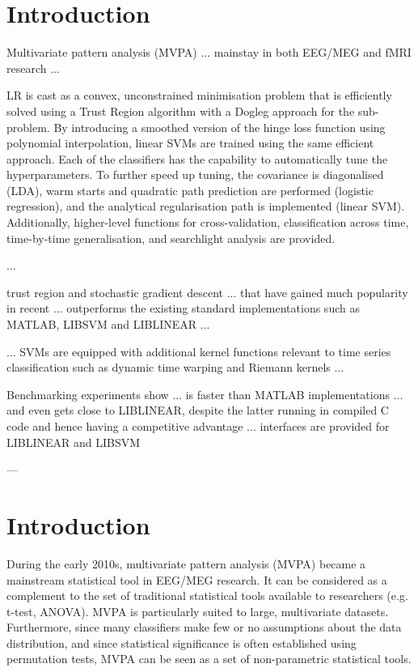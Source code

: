 \documentclass[utf8]{frontiersSCNS} %
\begin{document}
\section{Introduction}

Multivariate pattern analysis (MVPA) ... mainstay in both EEG/MEG and fMRI research ...


LR is cast as a convex, unconstrained minimisation problem that is efficiently solved using a Trust Region algorithm with a Dogleg approach for the sub-problem. By introducing a smoothed version of the hinge loss function using polynomial interpolation, linear SVMs are trained using the same efficient approach. Each of the classifiers has the capability to automatically tune the hyperparameters. To further speed up tuning, the covariance is diagonalised (LDA), warm starts and quadratic path prediction are performed (logistic regression), and the analytical regularisation path is implemented (linear SVM). Additionally, higher-level functions for cross-validation, classification across time, time-by-time generalisation, and searchlight analysis are provided.

...

trust region and stochastic gradient descent ... that have gained much popularity in recent ...
outperforms the existing standard implementations such as MATLAB, LIBSVM and LIBLINEAR ...

...
SVMs are equipped with additional kernel functions relevant to time series classification such as dynamic time warping and Riemann kernels ...


Benchmarking experiments show ... is faster than MATLAB implementations ... and even gets close to LIBLINEAR, despite the latter running in compiled C code and hence having a competitive advantage ...
interfaces are provided for LIBLINEAR and LIBSVM

---

\section{Introduction}

During the early 2010s, multivariate pattern analysis (MVPA) became a mainstream statistical tool in EEG/MEG research\cite{Blankertz2011,Grootswagers2017DecodingData}. It can be considered as a complement to the set of traditional statistical tools available to researchers (e.g. t-test, ANOVA). MVPA is particularly suited to large, multivariate datasets. Furthermore, since many classifiers make few or no assumptions about the data distribution, and since  statistical significance is often established using permutation tests, MVPA can be seen as a set of non-parametric statistical tools.
\end{document}
